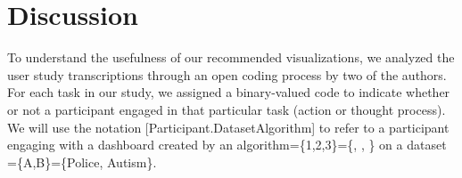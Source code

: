 
\section{Discussion}
To understand the usefulness of our recommended visualizations, we analyzed the user study transcriptions through an open coding process by two of the authors. For each task in our study, we assigned a binary-valued code to indicate whether or not a participant engaged in that particular task (action or thought process). We will use the notation [Participant.DatasetAlgorithm] to refer to a participant engaging with a dashboard created by an algorithm=\{1,2,3\}=\{\system, \cluster, \BFS\} on a dataset =\{A,B\}=\{Police, Autism\}.
